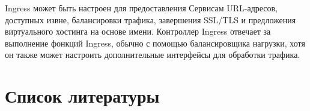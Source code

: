 \documentclass[a4page]{article}
\begin{document}
Ingress может быть настроен для предоставления Сервисам URL-адресов, \\доступных извне, балансировки трафика, завершения SSL/TLS и предложения виртуального хостинга на основе имени\cite{k8s:ingress}. Контроллер Ingress отвечает за выполнение фонкций Ingress, обычно с помощью балансировщика нагрузки, хотя он также может настроить дополнительные интерфейсы для обработки трафика.

\newpage

\section{Список литературы}

\printbibliography [heading=none]
\end{document}
